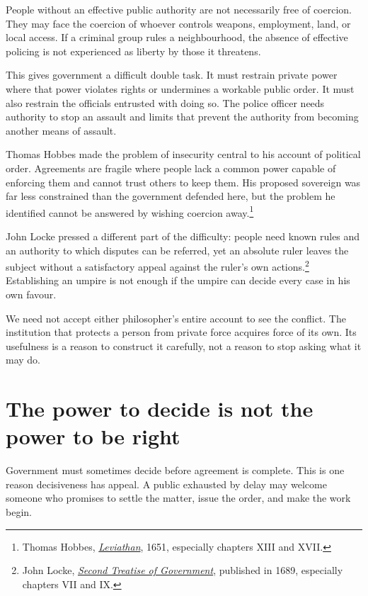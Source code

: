 \documentclass[12pt,a4paper]{book}
\begin{document}
People without an effective public authority are not necessarily free of coercion. They may face the coercion of whoever controls weapons, employment, land, or local access. If a criminal group rules a neighbourhood, the absence of effective policing is not experienced as liberty by those it threatens.

This gives government a difficult double task. It must restrain private power where that power violates rights or undermines a workable public order. It must also restrain the officials entrusted with doing so. The police officer needs authority to stop an assault and limits that prevent the authority from becoming another means of assault.

Thomas Hobbes made the problem of insecurity central to his account of political order. Agreements are fragile where people lack a common power capable of enforcing them and cannot trust others to keep them. His proposed sovereign was far less constrained than the government defended here, but the problem he identified cannot be answered by wishing coercion away.\footnote{Thomas Hobbes, \href{https://www.gutenberg.org/files/3207/3207-h/3207-h.htm}{\emph{Leviathan}}, 1651, especially chapters XIII and XVII.}

John Locke pressed a different part of the difficulty: people need known rules and an authority to which disputes can be referred, yet an absolute ruler leaves the subject without a satisfactory appeal against the ruler's own actions.\footnote{John Locke, \href{https://www.gutenberg.org/files/7370/7370-h/7370-h.htm}{\emph{Second Treatise of Government}}, published in 1689, especially chapters VII and IX.} Establishing an umpire is not enough if the umpire can decide every case in his own favour.

We need not accept either philosopher's entire account to see the conflict. The institution that protects a person from private force acquires force of its own. Its usefulness is a reason to construct it carefully, not a reason to stop asking what it may do.

\section*{The power to decide is not the power to be right}

Government must sometimes decide before agreement is complete. This is one reason decisiveness has appeal. A public exhausted by delay may welcome someone who promises to settle the matter, issue the order, and make the work begin.
\end{document}
